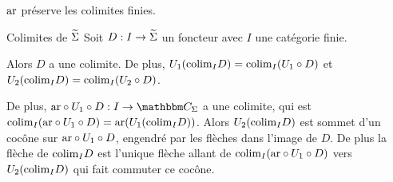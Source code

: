 \begin{cor}\label{arfExact}
    $\text{ar}$ préserve les colimites finies.
\end{cor}

\begin{theo}{Colimites de $\widetilde{\Sigma}$}\label{commaCL}
    Soit $D : I\rightarrow\widetilde{\Sigma}$ un foncteur avec $I$ une catégorie finie.

    Alors $D$ a une colimite. De plus, $U_1(\text{colim}_I D) = \text{colim}_I (U_1\circ D)$ et
    $U_2(\text{colim}_I D) = \text{colim}_I (U_2\circ D)$.

    De plus, $\arf\circ U_1\circ D : I\rightarrow\C_\Sigma$ a une colimite, qui
    est $\text{colim}_I (\text{ar}\circ U_1\circ D) = \text{ar}(U_1(\text{colim}_I D))$. Alors
    $U_2(\text{colim}_I D)$ est sommet d'un cocône sur $\text{ar}\circ U_1\circ D$, engendré
    par les flèches dans l'image de $D$. De plus la flèche de $\text{colim}_I D$ est
    l'unique flèche allant de $\text{colim}_I (\text{ar}\circ U_1\circ D)$ vers $U_2(\text{colim}_I D)$
    qui fait commuter ce cocône.
\end{theo}

